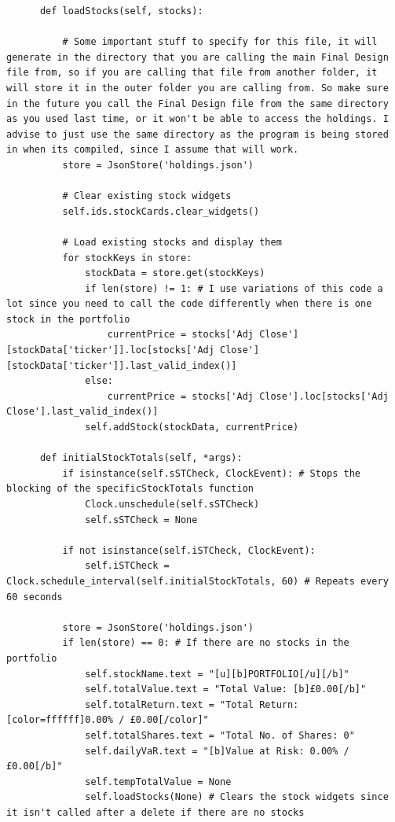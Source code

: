 \documentclass{article}
\begin{document}
\begin{verbatim}
      def loadStocks(self, stocks):
          
          # Some important stuff to specify for this file, it will generate in the directory that you are calling the main Final Design file from, so if you are calling that file from another folder, it will store it in the outer folder you are calling from. So make sure in the future you call the Final Design file from the same directory as you used last time, or it won't be able to access the holdings. I advise to just use the same directory as the program is being stored in when its compiled, since I assume that will work.
          store = JsonStore('holdings.json')

          # Clear existing stock widgets
          self.ids.stockCards.clear_widgets()

          # Load existing stocks and display them
          for stockKeys in store:
              stockData = store.get(stockKeys)
              if len(store) != 1: # I use variations of this code a lot since you need to call the code differently when there is one stock in the portfolio
                  currentPrice = stocks['Adj Close'][stockData['ticker']].loc[stocks['Adj Close'][stockData['ticker']].last_valid_index()]
              else:
                  currentPrice = stocks['Adj Close'].loc[stocks['Adj Close'].last_valid_index()]
              self.addStock(stockData, currentPrice)        

      def initialStockTotals(self, *args):
          if isinstance(self.sSTCheck, ClockEvent): # Stops the blocking of the specificStockTotals function
              Clock.unschedule(self.sSTCheck)
              self.sSTCheck = None

          if not isinstance(self.iSTCheck, ClockEvent): 
              self.iSTCheck = Clock.schedule_interval(self.initialStockTotals, 60) # Repeats every 60 seconds

          store = JsonStore('holdings.json')
          if len(store) == 0: # If there are no stocks in the portfolio
              self.stockName.text = "[u][b]PORTFOLIO[/u][/b]"
              self.totalValue.text = "Total Value: [b]£0.00[/b]"
              self.totalReturn.text = "Total Return: [color=ffffff]0.00% / £0.00[/color]"
              self.totalShares.text = "Total No. of Shares: 0"
              self.dailyVaR.text = "[b]Value at Risk: 0.00% / £0.00[/b]"
              self.tempTotalValue = None
              self.loadStocks(None) # Clears the stock widgets since it isn't called after a delete if there are no stocks


\end{verbatim}
\end{document}

